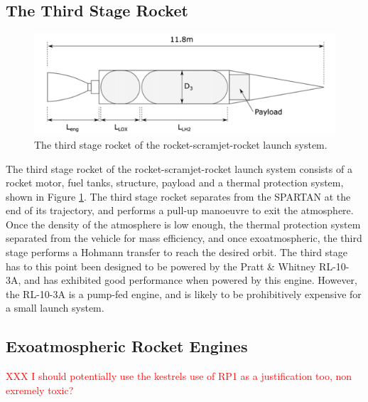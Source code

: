 \subsection{The Third Stage Rocket}
\begin{figure}[ht]
	\centering
	\includegraphics[width=0.7\linewidth]{figures/2_literature-review/ThirdStage}
	\caption{The third stage rocket of the rocket-scramjet-rocket launch system\cite{Preller2017b}.}
	\label{fig:ThirdStage}
\end{figure}
The third stage rocket of the rocket-scramjet-rocket launch system consists of a rocket motor, fuel tanks, structure, payload and a thermal protection system\cite{Preller2017b}, shown in Figure \ref{fig:ThirdStage}. 
The third stage rocket separates from the SPARTAN at the end of its trajectory, and performs a pull-up manoeuvre to exit the atmosphere. Once the density of the atmosphere is low enough, the thermal protection system separated from the vehicle for mass efficiency, and once exoatmospheric, the third stage performs a Hohmann transfer to reach the desired orbit. 
The third stage has to this point been designed to be powered by the Pratt \& Whitney RL-10-3A\cite{Preller2017b}, and has exhibited good performance when powered by this engine. However, the RL-10-3A is a pump-fed engine, and is likely to be prohibitively expensive for a small launch system. 

 




\subsection{Exoatmospheric Rocket Engines}
\textcolor{red}{XXX I should potentially use the kestrels use of RP1 as a justification too, non exremely toxic?}

